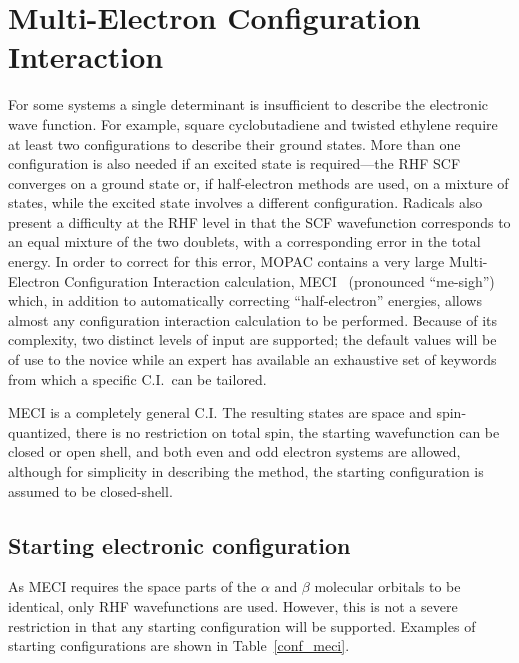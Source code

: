 \section{Multi-Electron Configuration Interaction}\label{meci}
 For some systems a single determinant is insufficient
to describe the electronic wave function. For example, square
cyclobutadiene and twisted ethylene require at least two configurations to
describe their ground states. More than one configuration is also needed if an
excited state is required---the RHF SCF converges on a ground state or, if
 half-electron methods are used, on a mixture of states,
while the excited state involves a different configuration. 
Radicals also present a difficulty at the RHF level in that the SCF
wavefunction corresponds to an equal mixture of the two doublets, with a
corresponding error in the total energy. In order to correct for this error,
MOPAC contains   a    very   large   Multi-Electron   Configuration
Interaction  calculation,  MECI~\cite{meci} (pronounced ``me-sigh'')   which,
in addition to automatically correcting ``half-electron'' energies, allows
almost any configuration interaction calculation to be performed.  Because of
its complexity, two distinct  levels  of  input are supported; the default
values will be of use to the novice while an expert has available  an
exhaustive  set  of keywords from which a specific C.I.\ can be tailored.

MECI is a completely general C.I. The resulting states  are space and spin-quantized, there is
no restriction on total spin, the starting wavefunction can be closed or open
shell, and both even and odd electron systems are allowed, although for
simplicity in describing the method,  the starting configuration is assumed to
be closed-shell.

\subsection{Starting electronic configuration}
As MECI requires the space parts of the $\alpha$ and $\beta$ molecular orbitals
to be identical, only RHF wavefunctions are used. However, this is not a severe
restriction in  that  any  starting configuration will be supported.  Examples
of starting configurations are shown in Table~\ref{conf_meci}.

